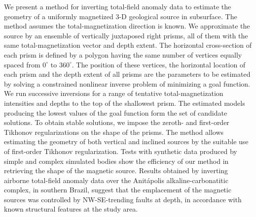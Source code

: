 \begin{summary}
We present a method for inverting total-field anomaly data to estimate the geometry of 
a uniformly magnetized 3-D geological source in subsurface. The method assumes 
the total-magnetization direction is known. We approximate the source by an 
ensemble of vertically juxtaposed right prisms, all of them with the same 
total-magnetization vector and depth extent. The horizontal cross-section 
of each prism is defined by a polygon having the same number of vertices 
equally spaced from $0^{\circ}$ to $360^{\circ}$. The position of these 
vertices, the horizontal location of each prism and the depth extent of all prisms 
are the parameters to be estimated by solving a constrained nonlinear inverse problem 
of minimizing a goal function. 
We run successive inversions for a range of tentative total-magnetization intensities 
and depths to the top of the shallowest prism. The estimated models producing 
the lowest values of the goal function form the set of candidate solutions.
To obtain stable solutions, we impose the zeroth- and first-order Tikhonov 
regularizations on the shape of the prisms. The method allows estimating the geometry 
of both vertical and inclined sources by the suitable use of first-order Tikhonov 
regularization. Tests with synthetic data produced by simple and complex simulated 
bodies show the efficiency of our method in retrieving the shape of the magnetic 
source. Results obtained by inverting airborne total-field anomaly data over the 
Anit{\'a}polis alkaline-carbonatitic complex, in southern Brazil, 
suggest that the emplacement of the magnetic sources was controlled by NW-SE-trending 
faults at depth, in accordance with known structural features at the study area.
\end{summary}